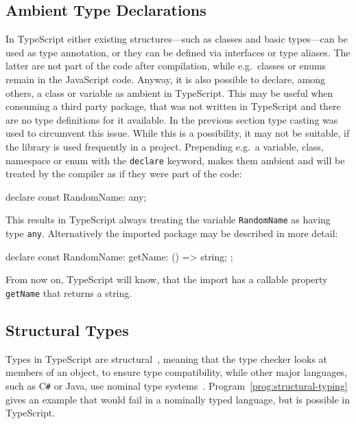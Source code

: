 \subsection{Ambient Type Declarations}
\label{sec:ts-ambient-type-declarations}
In TypeScript either existing structures---such as classes and basic types---can be used as type annotation, or they can be defined via interfaces or type aliases. The latter are not part of the code after compilation, while e.g.\ classes or enums remain in the JavaScript code. Anyway, it is also possible to declare, among others, a class or variable as ambient in TypeScript. This may be useful when consuming a third party package, that was not written in TypeScript and there are no type definitions for it available. In the previous section type casting was used to circumvent this issue. While this is a possibility, it may not be suitable, if the library is used frequently in a project. Prepending e.g.\ a variable, class, namespace or enum with the \texttt{declare} keyword, makes them ambient and will be treated by the compiler as if they were part of the code:
\begin{JsCode}[numbers=none]
declare const RandomName: any;
\end{JsCode}
This results in TypeScript always treating the variable \texttt{RandomName} as having type \texttt{any}. Alternatively the imported package may be described in more detail:
\begin{JsCode}[numbers=none]
declare const RandomName: {
  getName: () => string;
};
\end{JsCode}
From now on, TypeScript will know, that the import has a callable property \texttt{getName} that returns a string.


\subsection{Structural Types}
\label{sec:ts-structural-types}

Types in TypeScript are structural~\cite[p.~11]{TypeScriptBook:Syed:2017}, meaning that the type checker looks at members of an object, to ensure type compatibility, while other major languages, such as C\texttt{\#} or Java, use nominal type systems~\cite{TypeScriptHandbook:TypeCompatibility}. Program~\ref{prog:structural-typing} gives an example that would fail in a nominally typed language, but is possible in TypeScript.

